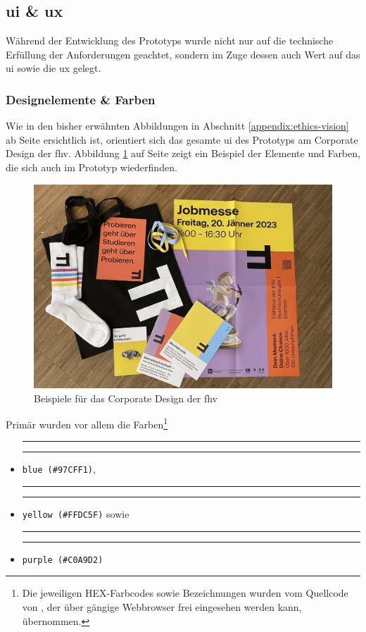 \documentclass[a4paper,12pt,twoside]{scrreprt}
\newcommand{\coloredSquare}[1]{%
  \textcolor{white}{\rule{1em}{1em}}%
  \textcolor[HTML]{#1}{\rule{0.8em}{0.8em}}%
}
\begin{document}
\subsection{\acl{ui} \& \acl{ux}}
\label{sub-sec:ausarbeitung-ui-ux}

Während der Entwicklung des Prototyps wurde nicht nur auf die technische Erfüllung der Anforderungen geachtet, sondern im Zuge dessen auch Wert auf das \acl{ui} sowie die \acl{ux} gelegt. 

\subsubsection*{Designelemente \& Farben}
\label{sub-sub-sec:designelemente-farben}

Wie in den bisher erwähnten Abbildungen in Abschnitt \ref{appendix:ethics-vision} ab Seite \pageref{appendix:ethics-vision} ersichtlich ist, orientiert sich das gesamte \ac{ui} des Prototyps am Corporate Design der \ac{fhv}. Abbildung \ref{fig:fhv-cd} auf Seite \pageref{fig:fhv-cd} zeigt ein Beispiel der Elemente und Farben, die sich auch im Prototyp wiederfinden.

\begin{figure}[ht]
    \centering
    \includegraphics[width=.8\linewidth]{thesis/images/FHV_Corporate-Design-Beispiel.png}
    \caption[Beispiele für das Corporate Design der \acl{fhv}]{Beispiele für das Corporate Design der \acl{fhv} \cite{fachhochschule_vorarlberg_gmbh_and_2022}}
    \label{fig:fhv-cd}
\end{figure}

Primär wurden vor allem die Farben\footnote{Die jeweiligen HEX-Farbcodes sowie Bezeichnungen wurden vom Quellcode von \cite{fachhochschule_vorarlberg_gmbh_fachhochschule_2023}, der über gängige Webbrowser frei eingesehen werden kann, übernommen.}
\begin{itemize}
    \item \coloredSquare{97cff1} \texttt{blue (\#97CFF1)},
    \item \coloredSquare{ffdc5f} \texttt{yellow (\#FFDC5F)} sowie
    \item \coloredSquare{c0a9d2} \texttt{purple (\#C0A9D2)}
\end{itemize}
\end{document}
